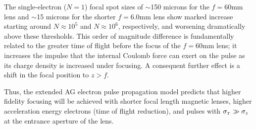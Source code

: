 The single-electron ($ N = 1 $) focal spot sizes of $\sim$150 microns for the $ f = 60 \text{mm} $ lens and $\sim$15 microns for the shorter $ f = 6.0 \text{mm} $ lens show marked increase starting around $ N \approx 10^{ 5 } $ and $ N \approx 10^{ 6 }$, respectively, and worsening dramatically above these thresholds.
This order of magnitude difference is fundamentally related to the greater time of flight before the focus of the $ f = 60\text{mm} $ lens; it increases the impulse that the internal Coulomb force can exert on the pulse as its charge density is increased under focusing.
A consequent further effect is a shift in the focal position to $ z > f $.


Thus, the extended AG electron pulse propagation model predicts that higher fidelity focusing will be achieved with shorter focal length magnetic lenses, higher acceleration energy electrons (time of flight reduction), and pulses with $ \sigma_{ {\scriptscriptstyle T} } \gg \sigma_{ z } $ at the entrance aperture of the lens.

